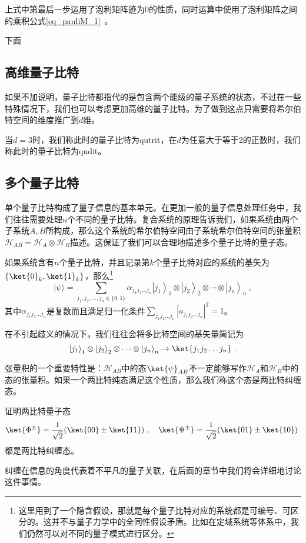上式中第最后一步运用了泡利矩阵迹为$0$的性质，同时运算中使用了泡利矩阵之间的乘积公式\autoref{eq_pauliM_1}~。

下面






\subsection{高维量子比特}

如果不加说明，量子比特都指代的是包含两个能级的量子系统的状态，不过在一些特殊情况下，我们也可以考虑更加高维的量子比特。为了做到这点只需要将希尔伯特空间的维度推广到$d$维。

当$d=3$时，我们称此时的量子比特为qutrit，在$d$为任意大于等于2的正数时，我们称此时的量子比特为qudit。

\subsection{多个量子比特}


单个量子比特构成了量子信息的基本单元。在更加一般的量子信息处理任务中，我们往往需要处理$n$个不同的量子比特。复合系统的原理告诉我们，如果系统由两个子系统$A,B$所构成，那么这个系统的希尔伯特空间由子系统希尔伯特空间的张量积$\mathcal{H}_{AB}=\mathcal{H}_A\otimes\mathcal{H}_B$描述。这保证了我们可以合理地描述多个量子比特的量子态。

如果系统含有$n$个量子比特，并且记录第$k$个量子比特对应的系统的基矢为$\{\ket{0}_k,\ket{1}_k\}$，那么\footnote{这里用到了一个隐含假设，那就是每个量子比特对应的系统都是可编号、可区分的。这并不与量子力学中的全同性假设矛盾。比如在定域系统等体系中，我们仍然可以对不同的量子模式进行区分。}$$
|\psi\rangle=\sum_{j_1, j_2, \ldots, j_n \in\{0,1\}} \alpha_{j_1 j_2 \ldots j_n}\left|j_1\right\rangle_1 \otimes\left|j_2\right\rangle_2 \otimes \cdots \otimes\left|j_n\right\rangle_n~,
$$其中$\alpha_{j_1j_2\ldots j_n}$是复数而且满足归一化条件$\sum_{j_1j_2\ldots j_n}|a_{j_1j_2\ldots j_n}|^2=1$。

在不引起歧义的情况下，我们往往会将多比特空间的基矢量简记为$$\left|j_1\right\rangle_1 \otimes\left|j_2\right\rangle_2 \otimes \cdots \otimes\left|j_n\right\rangle_n\to \ket{j_1j_2\ldots j_n}~. $$

张量积的一个重要特性是：$\mathcal{H}_{AB}$中的态$\ket{\psi}_{AB}$不一定能够写作$\mathcal{H}_A$和$\mathcal{H}_B$中的态的张量积。如果一个两比特纯态满足这个性质，那么我们称这个态是两比特纠缠态。
\begin{exercise}{}
证明两比特量子态$$\ket{\Phi^{\pm}}=\frac{1}{\sqrt{2}}(\ket{00}\pm\ket{11})~,\quad \ket{\Psi^{\pm}}=\frac{1}{\sqrt{2}}(\ket{01}\pm\ket{10})~$$
都是两比特纠缠态。
\end{exercise}

纠缠在信息的角度代表着不平凡的量子关联，在后面的章节中我们将会详细地讨论这件事情。
